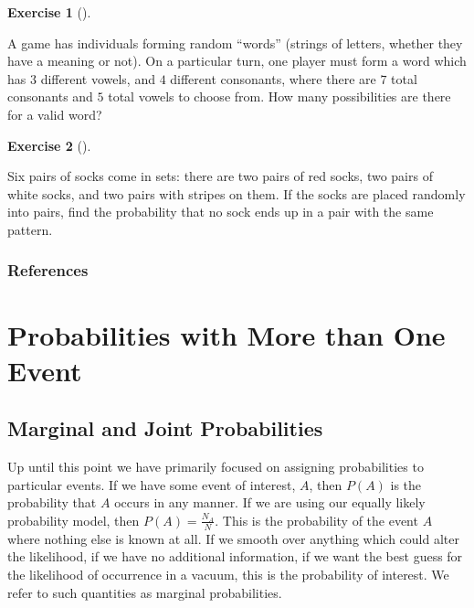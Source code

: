 \documentclass[
  letterpaper,
  DIV=11,
  numbers=noendperiod]{scrreprt}
\theoremstyle{definition}
\newtheorem{exercise}{Exercise}[chapter]
\theoremstyle{definition}
\theoremstyle{definition}
\theoremstyle{remark}
\begin{document}
\begin{exercise}[]\protect\hypertarget{exr-3.20}{}\label{exr-3.20}

A game has individuals forming random ``words'' (strings of letters,
whether they have a meaning or not). On a particular turn, one player
must form a word which has \(3\) different vowels, and \(4\) different
consonants, where there are \(7\) total consonants and \(5\) total
vowels to choose from. How many possibilities are there for a valid
word?

\end{exercise}

\begin{exercise}[]\protect\hypertarget{exr-3.21}{}\label{exr-3.21}

Six pairs of socks come in sets: there are two pairs of red socks, two
pairs of white socks, and two pairs with stripes on them. If the socks
are placed randomly into pairs, find the probability that no sock ends
up in a pair with the same pattern.

\end{exercise}

\subsection*{References}\label{references-1}

\chapter{Probabilities with More than One
Event}\label{probabilities-with-more-than-one-event}

\section{Marginal and Joint
Probabilities}\label{marginal-and-joint-probabilities}

Up until this point we have primarily focused on assigning probabilities
to particular events. If we have some event of interest, \(A\), then
\(P(A)\) is the probability that \(A\) occurs in any manner. If we are
using our equally likely probability model, then
\(P(A) = \frac{N_A}{N}\). This is the probability of the event \(A\)
where nothing else is known at all. If we smooth over anything which
could alter the likelihood, if we have no additional information, if we
want the best guess for the likelihood of occurrence in a vacuum, this
is the probability of interest. We refer to such quantities as marginal
probabilities.
\end{document}

